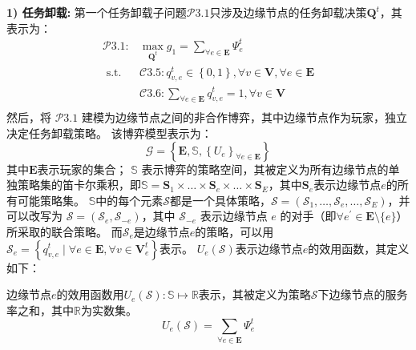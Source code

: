 \textbf{1) 任务卸载:} 第一个任务卸载子问题$\mathcal{P}3.1$只涉及边缘节点的任务卸载决策$\mathbf{Q}^{t}$，其表示为：
\begin{equation}
	\begin{aligned}
		\mathcal{P}3.1: &\max_{\mathbf{Q}^{t}} g_1= \sum_{ \forall e \in \mathbf{E}} \Psi_{e}^{t}  \\
		\text { s.t. }  
		&\mathcal{C}3.5: q_{v, e}^t \in \left \{0, 1\right \}, \forall v \in \mathbf{V}, \forall e \in \mathbf{E}  \\
        &\mathcal{C}3.6: \sum_{\forall e \in \mathbf{E}} q_{v, e}^t = 1, \forall v \in \mathbf{V} \\
	\end{aligned}
\end{equation}
然后，将 $\mathcal{P}3.1$ 建模为边缘节点之间的非合作博弈，其中边缘节点作为玩家，独立决定任务卸载策略。
该博弈模型表示为：
\begin{equation}
	\mathcal{G} = \left\{\mathbf{E}, \mathbb{S}, \left\{{U}_{e}\right\}_{\forall e \in \mathbf{E}} \right\}
\end{equation}
其中$\mathbf{E}$表示玩家的集合；
$\mathbb{S}$ 表示博弈的策略空间，其被定义为所有边缘节点的单独策略集的笛卡尔乘积，即$\mathbb{S} = \mathbf{S}_{1} \times \ldots \times \mathbf{S}_{e} \times \ldots \times \mathbf{S}_{E}$，其中$\mathbf{S}_{e}$表示边缘节点$e$的所有可能策略集。
$\mathbb{S}$中的每个元素$\mathcal{S}$都是一个具体策略，$\mathcal{S} = \left(\mathcal{S}_{1}, \ldots, \mathcal{S}_{e}, \ldots, \mathcal{S}_{E} \right)$，并可以改写为 $\mathcal{S}=\left( \mathcal{S}_{e}, \mathcal{S}_{-e}\right)$，其中 $\mathcal{S}_{-e}$ 表示边缘节点 $e$ 的对手（即$\forall e^{\prime} \in \mathbf{E} \setminus \{e\}$）所采取的联合策略。
而$\mathcal{S}_{e}$是边缘节点$e$的策略，可以用$\mathcal{S}_{e} = \left\{ q_{v, e}^t \mid \forall e \in \mathbf{E}, \forall v \in \mathbf{V}_{e}^{t} \right\}$表示。
${U}_{e}\left(\mathcal{S}\right)$表示边缘节点$e$的效用函数，其定义如下：
\begin{definition}
边缘节点$e$的效用函数用${U}_{e}\left(\mathcal{S}\right): \mathbb{S} \mapsto \mathbb{R}$表示，其被定义为策略$\mathcal{S}$下边缘节点的服务率之和，其中$\mathbb{R}$为实数集。
	\begin{equation}
		{U}_{e}\left(\mathcal{S}\right) = \sum_{\forall e \in \mathbf{E}} \Psi_{e}^{t}
	\end{equation}
\end{definition}

